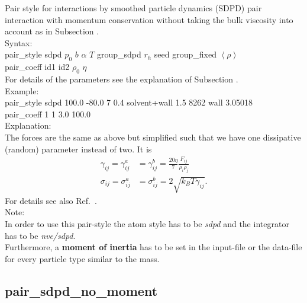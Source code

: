 \documentclass[a4paper,10pt]{scrreprt}
\begin{document}
Pair style for interactions by smoothed particle dynamics (SDPD) pair interaction with momentum conservation without taking the bulk viscosity into account as in Subsection .
\\[2ex]
Syntax:
\\[1ex]
pair\_style      sdpd $p_0$ $b$ $\alpha$ $T$ group\_sdpd $r_h$ seed group\_fixed $\left< \rho \right>$
\\[1ex]
pair\_coeff      id1 id2 $\rho_0$ $\eta$\\[2ex]
For details of the parameters see the explanation of Subsection .\\[2ex]
Example:
\\[0.5ex]
pair\_style      sdpd 100.0 -80.0 7 0.4 solvent+wall 1.5 8262 wall 3.05018
\\[1ex]
pair\_coeff      1 1 3.0 100.0
\\[2ex]
Explanation:\\
The forces are the same as above but simplified such that we have one dissipative (random) parameter instead of two. 
It is  
\begin{align}\label{eq:singlep}
	\gamma_{ij} = \gamma^a_{ij} &= \gamma^b_{ij} = \frac{20\eta}{7}\frac{F_{ij}}{\rho_i\rho_j}  \\
  \sigma_{ij} = \sigma^a_{ij} &=\sigma^b_{ij} = 2\sqrt{k_BT\gamma_{ij}}. \nonumber
\end{align}
For details see also Ref.~\cite{Mueller_SDPD_2015}.\\[2ex]
Note:\\
In order to use this pair-style the atom style has to be \textit{sdpd} and the integrator has to be \textit{nve/sdpd}.\\ 
Furthermore, a \textbf{moment of inertia} has to be set in the input-file or the data-file for every particle type similar to the mass.


\subsection{pair\_sdpd\_no\_moment}\label{sec:pair/sdpd/nomoment}
\end{document}

